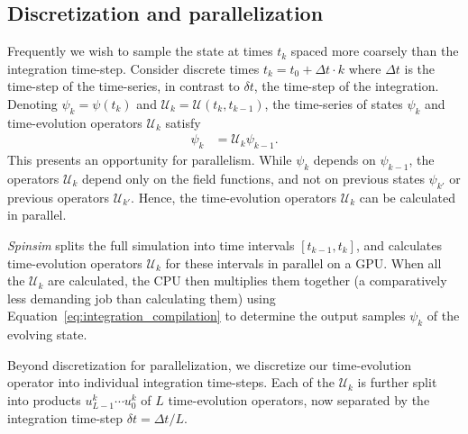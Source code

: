 \documentclass{jors}
\begin{document}
	\subsection{Discretization and parallelization}\label{sec:parallelization}
		Frequently we wish to sample the state at times $ t_k $ spaced more coarsely than the integration time-step.
		Consider discrete times $ t_k = t_0 + \Delta t\cdot k $ where $ \Delta t $ is the time-step of the time-series, in contrast to $ \delta t $, the time-step of the integration.
		Denoting $ \psi_k = \psi(t_k) $ and $ \mathcal{U}_k = \mathcal{U}(t_{k}, t_{k-1}) $, the time-series of states $  \psi_k $ and time-evolution operators $ \mathcal{U}_k $ satisfy
		\begin{align}
			\psi_k &= \mathcal{U}_k\psi_{k-1}.\label{eq:integration_compilation}
		\end{align}
		This presents an opportunity for parallelism.
		While $ \psi_k $ depends on $ \psi_{k-1} $, the operators $ \mathcal{U}_k $ depend only on the field functions, and not on previous states $ \psi_{k'} $ or previous operators $ \mathcal{U}_{k'} $.
		Hence, the time-evolution operators $ \mathcal{U}_k $ can be calculated in parallel.

		\emph{Spinsim} splits the full simulation into time intervals $ [t_{k - 1}, t_{k}] $, and calculates time-evolution operators $ \mathcal{U}_k $ for these intervals in parallel on a GPU. %
		When all the $ \mathcal{U}_k $ are calculated, the CPU then multiplies them together (a comparatively less demanding job than calculating them) using Equation~\eqref{eq:integration_compilation} to determine the output samples $ \psi_k $ of the evolving state.

		Beyond discretization for parallelization, we discretize our time-evolution operator into individual integration time-steps.
		Each of the $ \mathcal{U}_k $ is further split into products $ u^k_{L-1} \cdots u^k_0 $ of $ L $ time-evolution operators, now separated by the integration time-step $ \delta t = \Delta t/L $.
		
\end{document}
